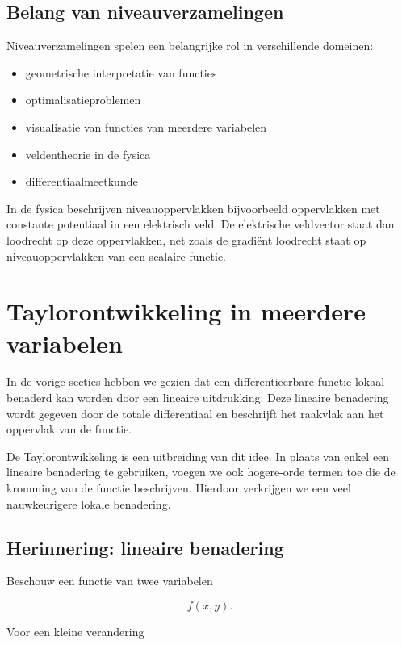 \documentclass[11pt,a4paper]{article}
\begin{document}
    \subsection{Belang van niveauverzamelingen}

    Niveauverzamelingen spelen een belangrijke rol in verschillende domeinen:

    \begin{itemize}
        \item geometrische interpretatie van functies
        \item optimalisatieproblemen
        \item visualisatie van functies van meerdere variabelen
        \item veldentheorie in de fysica
        \item differentiaalmeetkunde
    \end{itemize}

    In de fysica beschrijven niveauoppervlakken bijvoorbeeld
    oppervlakken met constante potentiaal in een elektrisch veld.
    De elektrische veldvector staat dan loodrecht op deze oppervlakken,
    net zoals de gradiënt loodrecht staat op niveauoppervlakken van een
    scalaire functie.


    \section{Taylorontwikkeling in meerdere variabelen}

    In de vorige secties hebben we gezien dat een differentieerbare functie
    lokaal benaderd kan worden door een lineaire uitdrukking. Deze lineaire
    benadering wordt gegeven door de totale differentiaal en beschrijft het
    raakvlak aan het oppervlak van de functie.

    De Taylorontwikkeling is een uitbreiding van dit idee. In plaats van enkel
    een lineaire benadering te gebruiken, voegen we ook hogere-orde termen toe
    die de kromming van de functie beschrijven. Hierdoor verkrijgen we een
    veel nauwkeurigere lokale benadering.

    \subsection{Herinnering: lineaire benadering}

    Beschouw een functie van twee variabelen

    \[
        f(x,y).
    \]

    Voor een kleine verandering
\end{document}
